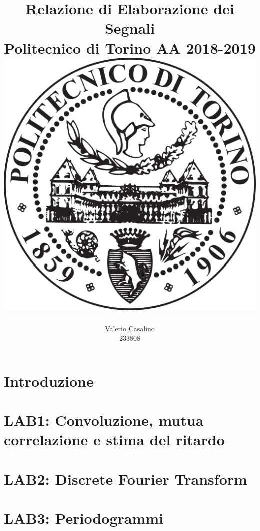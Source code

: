 \documentclass[12pt, a4paper]{report}
\author{
\LARGE
Valerio Casalino \\ 
\LARGE
233808 
}
\title{ 
\Huge
\textbf{Relazione di Elaborazione dei Segnali} \\ 
\LARGE
Politecnico di Torino AA 2018-2019 \\
\vspace*{2cm} 
\includegraphics[width=.5\textwidth]{images/logo.png}
}
\date{}
\begin{document}
\maketitle

\cleardoublepage
\tableofcontents

\chapter{Introduzione}


\chapter{LAB1: Convoluzione, mutua correlazione e stima del ritardo}


\chapter{LAB2: Discrete Fourier Transform}


\chapter{LAB3: Periodogrammi}

\end{document}
